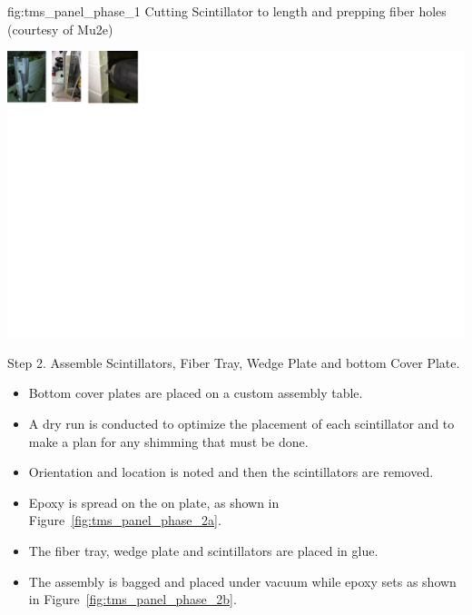 \begin{dunefigure}{fig:tms_panel_phase_1}
{Cutting Scintillator to length and prepping fiber holes (courtesy of Mu2e)}
\begin{center}
\includegraphics[trim= 0 580 0 0 clip, width=3.5\textwidth]{graphics/tms/TMS-Other/Fig39.png}
\end{center}
\end{dunefigure}

Step 2.	Assemble Scintillators, Fiber Tray, Wedge Plate and bottom Cover Plate.
\begin{itemize}
\item{Bottom cover plates are placed on a custom assembly table.}
\item{A dry run is conducted to optimize the placement of each scintillator and to make a plan for any shimming that must be done.}
\item{Orientation and location is noted and  then the scintillators are removed.}
\item{Epoxy is spread on the on plate, as shown in Figure~\ref{fig:tms_panel_phase_2a}.} 
\item{The fiber tray, wedge plate and scintillators are placed in glue.} 
\item{The assembly is bagged and placed under vacuum while epoxy sets as shown in Figure~\ref{fig:tms_panel_phase_2b}.} 
\end{itemize}

